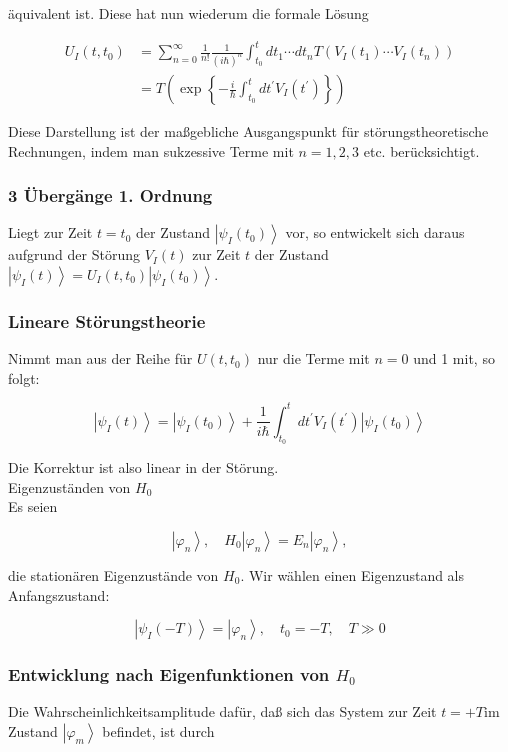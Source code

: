 \documentclass[10pt, letterpaper]{article}
\begin{document}
äquivalent ist. Diese hat nun wiederum die formale Lösung

$$
\begin{aligned}
U_{I}\left(t, t_{0}\right) & =\sum_{n=0}^{\infty} \frac{1}{n!} \frac{1}{(i \hbar)^{n}} \int_{t_{0}}^{t} d t_{1} \cdots d t_{n} T\left(V_{I}\left(t_{1}\right) \cdots V_{I}\left(t_{n}\right)\right) \\
& =T\left(\exp \left\{-\frac{i}{\hbar} \int_{t_{0}}^{t} d t^{\prime} V_{I}\left(t^{\prime}\right)\right\}\right)
\end{aligned}
$$

Diese Darstellung ist der maßgebliche Ausgangspunkt für störungstheoretische Rechnungen, indem man sukzessive Terme mit $n=1,2,3$ etc. berücksichtigt.

\subsubsection*{3 Übergänge 1. Ordnung}
Liegt zur Zeit $t=t_{0}$ der Zustand $\left|\psi_{I}\left(t_{0}\right)\right\rangle$ vor, so entwickelt sich daraus aufgrund der Störung $V_{I}(t)$ zur Zeit $t$ der Zustand $\left|\psi_{I}(t)\right\rangle=U_{I}\left(t, t_{0}\right)\left|\psi_{I}\left(t_{0}\right)\right\rangle$.

\subsubsection*{Lineare Störungstheorie}
Nimmt man aus der Reihe für $U\left(t, t_{0}\right)$ nur die Terme mit $n=0$ und 1 mit, so folgt:

$$
\left|\psi_{I}(t)\right\rangle=\left|\psi_{I}\left(t_{0}\right)\right\rangle+\frac{1}{i \hbar} \int_{t_{0}}^{t} d t^{\prime} V_{I}\left(t^{\prime}\right)\left|\psi_{I}\left(t_{0}\right)\right\rangle
$$

Die Korrektur ist also linear in der Störung.\\
Eigenzuständen von $H_{0}$\\
Es seien

$$
\left|\varphi_{n}\right\rangle, \quad H_{0}\left|\varphi_{n}\right\rangle=E_{n}\left|\varphi_{n}\right\rangle,
$$

die stationären Eigenzustände von $H_{0}$. Wir wählen einen Eigenzustand als Anfangszustand:

$$
\left|\psi_{I}(-T)\right\rangle=\left|\varphi_{n}\right\rangle, \quad t_{0}=-T, \quad T \gg 0
$$

\subsubsection*{Entwicklung nach Eigenfunktionen von $H_{0}$}
Die Wahrscheinlichkeitsamplitude dafür, daß sich das System zur Zeit $t=+T \mathrm{im}$ Zustand $\left|\varphi_{m}\right\rangle$ befindet, ist durch
\end{document}
